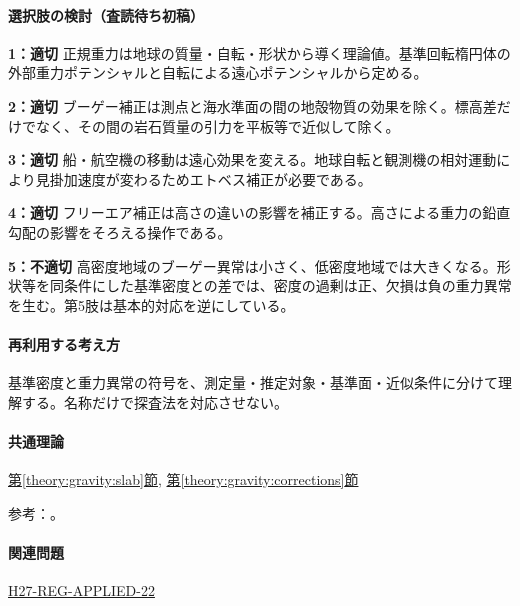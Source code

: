 \paragraph{選択肢の検討（査読待ち初稿）}\mbox{}\par

\noindent\textbf{1：適切} 正規重力は地球の質量・自転・形状から導く理論値。基準回転楕円体の外部重力ポテンシャルと自転による遠心ポテンシャルから定める。\par

\noindent\textbf{2：適切} ブーゲー補正は測点と海水準面の間の地殻物質の効果を除く。標高差だけでなく、その間の岩石質量の引力を平板等で近似して除く。\par

\noindent\textbf{3：適切} 船・航空機の移動は遠心効果を変える。地球自転と観測機の相対運動により見掛加速度が変わるためエトベス補正が必要である。\par

\noindent\textbf{4：適切} フリーエア補正は高さの違いの影響を補正する。高さによる重力の鉛直勾配の影響をそろえる操作である。\par

\noindent\textbf{5：不適切} 高密度地域のブーゲー異常は小さく、低密度地域では大きくなる。形状等を同条件にした基準密度との差では、密度の過剰は正、欠損は負の重力異常を生む。第5肢は基本的対応を逆にしている。\par

\paragraph{再利用する考え方} 基準密度と重力異常の符号を、測定量・推定対象・基準面・近似条件に分けて理解する。名称だけで探査法を対応させない。

\paragraph{共通理論} \hyperref[theory:gravity:slab]{第\ref*{theory:gravity:slab}節}, \hyperref[theory:gravity:corrections]{第\ref*{theory:gravity:corrections}節}

\par 参考：\cite{gsi_gravity_definitions}。

\paragraph{関連問題} \hyperref[q:h27-reg-applied-22]{H27-REG-APPLIED-22}


